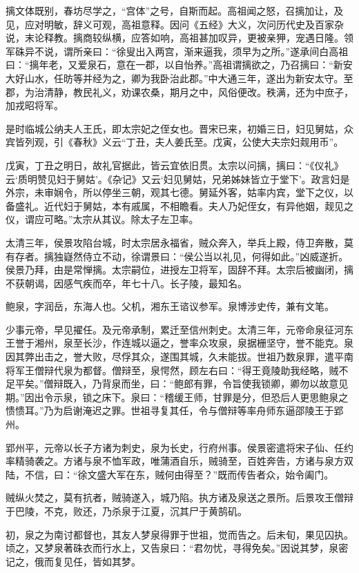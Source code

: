 \documentclass[12pt,UTF8]{ctexbook}
\begin{document}
摛文体既别，春坊尽学之，“宫体”之号，自斯而起。高祖闻之怒，召摛加让，及见，应对明敏，辞义可观，高祖意释。因问《五经》大义，次问历代史及百家杂说，末论释教。摛商较纵横，应答如响，高祖甚加叹异，更被亲狎，宠遇日隆。领军硃异不说，谓所亲曰：“徐叟出入两宫，渐来逼我，须早为之所。”遂承间白高祖曰：“摛年老，又爱泉石，意在一郡，以自怡养。”高祖谓摛欲之，乃召摛曰：“新安大好山水，任昉等并经为之，卿为我卧治此郡。”中大通三年，遂出为新安太守。至郡，为治清静，教民礼义，劝课农桑，期月之中，风俗便改。秩满，还为中庶子，加戎昭将军。

是时临城公纳夫人王氏，即太宗妃之侄女也。晋宋已来，初婚三日，妇见舅姑，众宾皆列观，引《春秋》义云“丁丑，夫人姜氏至。戊寅，公使大夫宗妇觌用币”。

戊寅，丁丑之明日，故礼官据此，皆云宜依旧贯。太宗以问摛，摛曰：“《仪礼》云‘质明赞见妇于舅姑’。《杂记》又云‘妇见舅姑，兄弟姊妹皆立于堂下’。政言妇是外宗，未审娴令，所以停坐三朝，观其七德。舅延外客，姑率内宾，堂下之仪，以备盛礼。近代妇于舅姑，本有戚属，不相瞻看。夫人乃妃侄女，有异他姻，觌见之仪，谓应可略。”太宗从其议。除太子左卫率。

太清三年，侯景攻陷台城，时太宗居永福省，贼众奔入，举兵上殿，侍卫奔散，莫有存者。摛独嶷然侍立不动，徐谓景曰：“侯公当以礼见，何得如此。”凶威遂折。侯景乃拜，由是常惮摛。太宗嗣位，进授左卫将军，固辞不拜。太宗后被幽闭，摛不获朝谒，因感气疾而卒，年七十八。长子陵，最知名。

鲍泉，字润岳，东海人也。父机，湘东王谘议参军。泉博涉史传，兼有文笔。

少事元帝，早见擢任。及元帝承制，累迁至信州刺史。太清三年，元帝命泉征河东王誉于湘州，泉至长沙，作连城以逼之，誉率众攻泉，泉据栅坚守，誉不能克。泉因其弊出击之，誉大败，尽俘其众，遂围其城，久未能拔。世祖乃数泉罪，遣平南将军王僧辩代泉为都督。僧辩至，泉愕然，顾左右曰：“得王竟陵助我经略，贼不足平矣。”僧辩既入，乃背泉而坐，曰：“鲍郎有罪，令旨使我锁卿，卿勿以故意见期。”因出令示泉，锁之床下。泉曰：“稽缓王师，甘罪是分，但恐后人更思鲍泉之愦愦耳。”乃为启谢淹迟之罪。世祖寻复其任，令与僧辩等率舟师东逼邵陵王于郢州。

郢州平，元帝以长子方诸为刺史，泉为长史，行府州事。侯景密遣将宋子仙、任约率精骑袭之。方诸与泉不恤军政，唯蒲酒自乐，贼骑至，百姓奔告，方诸与泉方双陆，不信，曰：“徐文盛大军在东，贼何由得至？”既而传告者众，始令阖门。

贼纵火焚之，莫有抗者，贼骑遂入，城乃陷。执方诸及泉送之景所。后景攻王僧辩于巴陵，不克，败还，乃杀泉于江夏，沉其尸于黄鹄矶。

初，泉之为南讨都督也，其友人梦泉得罪于世祖，觉而告之。后未旬，果见囚执。顷之，又梦泉著硃衣而行水上，又告泉曰：“君勿忧，寻得免矣。”因说其梦，泉密记之，俄而复见任，皆如其梦。
\end{document}
